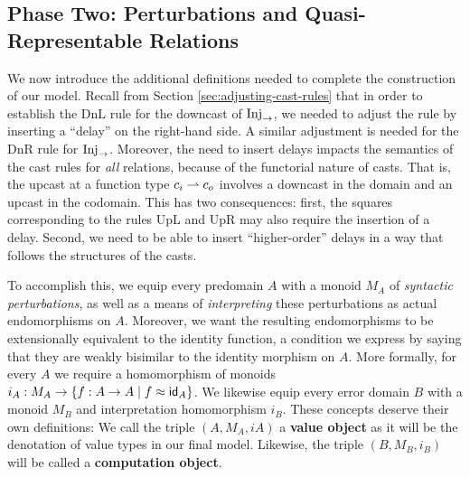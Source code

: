 

\subsection{Phase Two: Perturbations and Quasi-Representable Relations}

We now introduce the additional definitions needed to complete the construction
of our model. Recall from Section \ref{sec:adjusting-cast-rules} that in order
to establish the DnL rule for the downcast of $\text{Inj}_\to$, we needed to adjust the
rule by inserting a ``delay'' on the right-hand side. A similar adjustment is
needed for the DnR rule for $\text{Inj}_\to$. Moreover, the need to insert delays impacts
the semantics of the cast rules for \emph{all} relations, because of the
functorial nature of casts. That is, the upcast at a function type $c_i \rightharpoonup c_o$
involves a downcast in the domain and an upcast in the codomain. This has two
consequences: first, the squares corresponding to the rules UpL and UpR may
also require the insertion of a delay. Second, we need to be able to insert
``higher-order'' delays in a way that follows the structures of the casts.


To accomplish this, we equip every predomain $A$ with a monoid $M_A$ of
\emph{syntactic perturbations}, as well as a means of \emph{interpreting} these
perturbations as actual endomorphisms on $A$. Moreover, we want the resulting
endomorphisms to be extensionally equivalent to the identity function, a
condition we express by saying that they are weakly bisimilar to the identity
morphism on $A$. More formally, for every $A$ we require a homomorphism of
monoids $i_A : M_A \to \{ f : A \to A \mid f \approx \mathsf{id}_A \}$. We likewise equip
every error domain $B$ with a monoid $M_B$ and interpretation homomorphism
$i_B$. These concepts deserve their own definitions: We call the triple $(A,
M_A, iA)$ a \textbf{value object} as it will be the denotation of value types in
our final model. Likewise, the triple $(B, M_B, i_B)$ will be called a
\textbf{computation object}.


